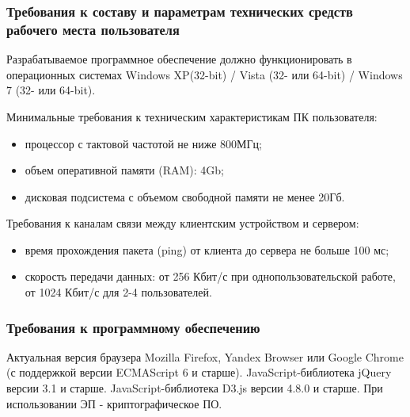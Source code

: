 \documentclass[a4paper]{extarticle}
\begin{document}
\subsubsection{Требования к составу и параметрам технических средств рабочего места пользователя}
Разрабатываемое программное обеспечение должно функционировать в операционных системах Windows XP(32-bit) / Vista (32- или 64-bit) / Windows 7 (32- или 64-bit).\par
Минимальные требования к техническим характеристикам ПК пользователя:\par
\begin{itemize}
  \item процессор с тактовой частотой не ниже 800МГц;
  \item объем оперативной памяти (RAM): 4Gb;
  \item дисковая подсистема с объемом свободной памяти не менее 20Гб.
\end{itemize}\par
Требования к каналам связи между клиентским устройством и сервером:\par
\begin{itemize}
  \item время прохождения пакета (ping) от клиента до сервера не больше 100 мс;
  \item скорость передачи данных: от 256 Кбит/с при однопользовательской работе, от 1024 Кбит/с для 2-4 пользователей.
\end{itemize}

\subsubsection{Требования к программному обеспечению}
Актуальная версия браузера Mozilla Firefox, Yandex Browser или Google Chrome (с поддержкой версии ECMAScript 6 и старше). JavaScript-библиотека jQuery версии 3.1 и старше. JavaScript-библиотека D3.js версии 4.8.0 и старше. При использовании ЭП - криптографическое ПО.
\end{document}
